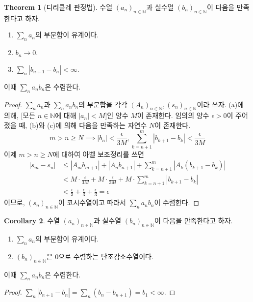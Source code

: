 \documentclass[11pt]{book}
\numberwithin{equation}{chapter}
\def\NN{\mathbb{N}}
\def\eps{\epsilon}
\newcommand{\abs}[1]{\left\vert#1\right\vert}
\theoremstyle{definition}
\newtheorem{thm}{Theorem}[section]
\newtheorem{cor}[thm]{Corollary}
\newenvironment{enum}
	{\begin{enumerate}[label=(\alph*), leftmargin=2\parindent]}
	{\end{enumerate}}
\begin{document}
\begin{thm}[디리클레 판정법] \label{5.8.2}
    수열 \((a_n)_{n \in \NN}\)과 실수열 \((b_n)_{n \in \NN}\)이 다음을 만족한다고 하자.
    \begin{enum}
        \item \(\sum_n a_n\)의 부분합이 유계이다.
        \item \(b_n \to 0\).
        \item \(\sum_n \abs{b_{n+1} - b_n} < \infty\).
    \end{enum}
    이때 \(\sum_n a_n b_n\)은 수렴한다.
\end{thm}
\begin{proof}
    \(\sum_n a_n\)과 \(\sum_n a_n b_n\)의 부분합을 각각 \((A_n)_{n \in \NN}, (s_n)_{n \in \NN}\)이라 쓰자. (a)에 의해, [모든 \(n \in \NN\)에 대해 \(\abs{a_n} < M\)]인 양수 \(M\)이 존재한다. 임의의 양수 \(\eps > 0\)이 주어졌을 때, (b)와 (c)에 의해 다음을 만족하는 자연수 \(N\)이 존재한다.
    \[
    m > n \ge N \implies \abs{b_n} < \frac{\eps}{3M}, \sum_{k=n+1}^m \abs{b_{k+1} - b_k} < \frac{\eps}{3M}   
    \]
    이제 \(m > n \ge N\)에 대하여 아벨 보조정리를 쓰면
    \begin{align*}
        \abs{s_m - s_n} &\le \abs{A_m b_{m+1}} + \abs{A_n b_{n+1}} + \sum_{k=n+1}^m \abs{A_k (b_{k+1} - b_k)}\\
        &< M \cdot \frac{\eps}{3M} + M \cdot \frac{\eps}{3M} + M \cdot \sum_{k=n+1}^m \abs{b_{k+1} - b_k}\\
        &< \frac{\eps}{3} + \frac{\eps}{3} +\frac{\eps}{3} = \eps
    \end{align*}
    이므로, \((s_n)_{n \in \NN}\)이 코시수열이고 따라서 \(\sum_n a_n b_n\)이 수렴한다.
\end{proof}

\begin{cor} \label{5.8.3}
    수열 \((a_n)_{n \in \NN}\)과 실수열 \((b_n)_{n \in \NN}\)이 다음을 만족한다고 하자.
    \begin{enum}
        \item \(\sum_n a_n\)의 부분합이 유계이다.
        \item \((b_n)_{n \in \NN}\)은 0으로 수렴하는 단조감소수열이다.
    \end{enum}
    이때 \(\sum_n a_n b_n\)은 수렴한다.
\end{cor}

\begin{proof}
    \(\sum_n \abs{b_{n+1} - b_n} = \sum_n (b_n - b_{n+1}) = b_1 < \infty\).
\end{proof}
\end{document}
